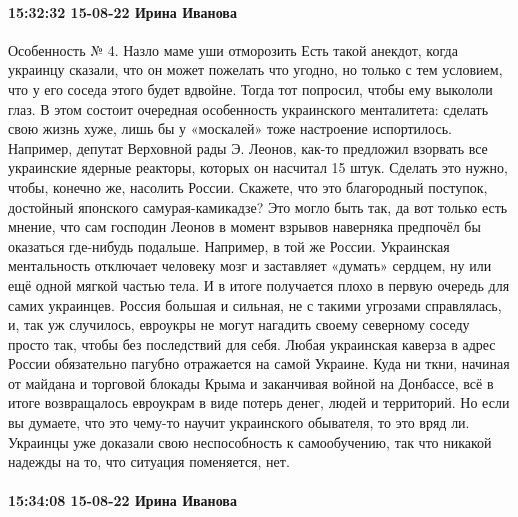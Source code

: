 \paragraph{15:32:32 15-08-22 Ирина Иванова}

Особенность № 4. Назло маме уши отморозить Есть такой анекдот, когда украинцу
сказали, что он может пожелать что угодно, но только с тем условием, что у его
соседа этого будет вдвойне. Тогда тот попросил, чтобы ему выкололи глаз. В этом
состоит очередная особенность украинского менталитета: сделать свою жизнь хуже,
лишь бы у «москалей» тоже настроение испортилось. Например, депутат Верховной
рады Э. Леонов, как-то предложил взорвать все украинские ядерные реакторы,
которых он насчитал 15 штук. Сделать это нужно, чтобы, конечно же, насолить
России. Скажете, что это благородный поступок, достойный японского
самурая-камикадзе? Это могло быть так, да вот только есть мнение, что сам
господин Леонов в момент взрывов наверняка предпочёл бы оказаться где-нибудь
подальше. Например, в той же России. Украинская ментальность отключает человеку
мозг и заставляет «думать» сердцем, ну или ещё одной мягкой частью тела. И в
итоге получается плохо в первую очередь для самих украинцев. Россия большая и
сильная, не с такими угрозами справлялась, и, так уж случилось, евроукры не
могут нагадить своему северному соседу просто так, чтобы без последствий для
себя. Любая украинская каверза в адрес России обязательно пагубно отражается на
самой Украине. Куда ни ткни, начиная от майдана и торговой блокады Крыма и
заканчивая войной на Донбассе, всё в итоге возвращалось евроукрам в виде потерь
денег, людей и территорий. Но если вы думаете, что это чему-то научит
украинского обывателя, то это вряд ли. Украинцы уже доказали свою неспособность
к самообучению, так что никакой надежды на то, что ситуация поменяется, нет.

\paragraph{15:34:08 15-08-22 Ирина Иванова}

